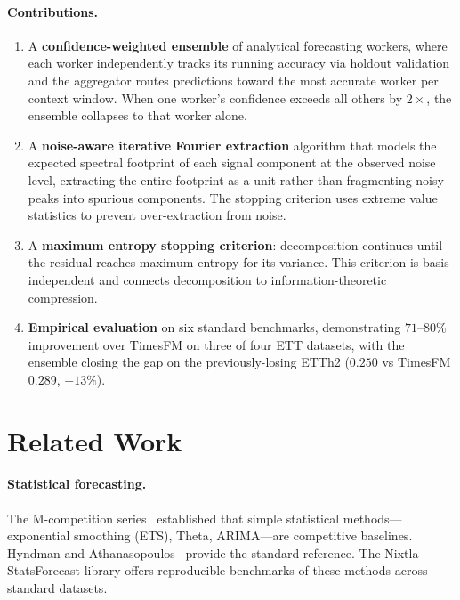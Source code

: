 \documentclass[sigconf,nonacm]{acmart}
\begin{document}
\paragraph{Contributions.}
\begin{enumerate}
\item A \textbf{confidence-weighted ensemble} of analytical forecasting workers, where each worker independently tracks its running accuracy via holdout validation and the aggregator routes predictions toward the most accurate worker per context window. When one worker's confidence exceeds all others by $2\times$, the ensemble collapses to that worker alone.

\item A \textbf{noise-aware iterative Fourier extraction} algorithm that models the expected spectral footprint of each signal component at the observed noise level, extracting the entire footprint as a unit rather than fragmenting noisy peaks into spurious components. The stopping criterion uses extreme value statistics to prevent over-extraction from noise.

\item A \textbf{maximum entropy stopping criterion}: decomposition continues until the residual reaches maximum entropy for its variance. This criterion is basis-independent and connects decomposition to information-theoretic compression.

\item \textbf{Empirical evaluation} on six standard benchmarks, demonstrating $71$--$80\%$ improvement over TimesFM on three of four ETT datasets, with the ensemble closing the gap on the previously-losing ETTh2 ($0.250$ vs TimesFM $0.289$, $+13\%$).
\end{enumerate}

\section{Related Work}

\paragraph{Statistical forecasting.}
The M-competition series~\cite{makridakis2020} established that simple statistical methods---exponential smoothing (ETS), Theta, ARIMA---are competitive baselines. Hyndman and Athanasopoulos~\cite{hyndman2021} provide the standard reference. The Nixtla StatsForecast library offers reproducible benchmarks of these methods across standard datasets.
\end{document}
